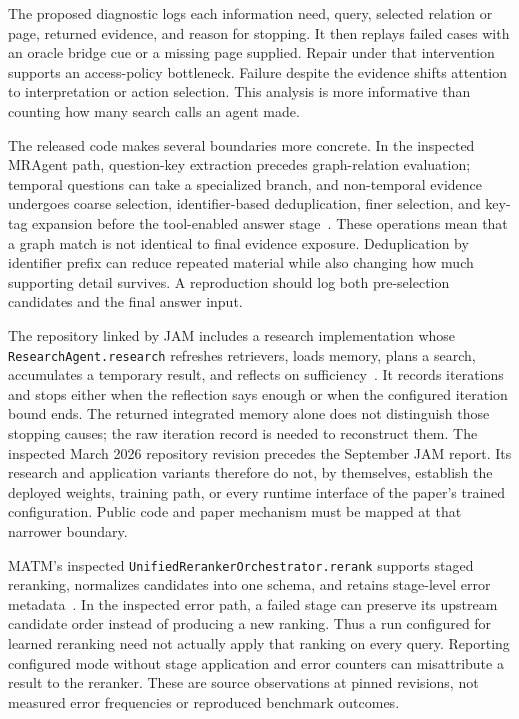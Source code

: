 The proposed diagnostic logs each information need, query, selected relation or page, returned evidence, and reason for stopping. It then replays failed cases with an oracle bridge cue or a missing page supplied. Repair under that intervention supports an access-policy bottleneck. Failure despite the evidence shifts attention to interpretation or action selection. This analysis is more informative than counting how many search calls an agent made.

The released code makes several boundaries more concrete. In the inspected MRAgent  path, question-key extraction precedes graph-relation evaluation; temporal questions can take a specialized branch, and non-temporal evidence undergoes coarse selection, identifier-based deduplication, finer selection, and key-tag expansion before the tool-enabled answer stage~\cite{repo_mragent2026}. These operations mean that a graph match is not identical to final evidence exposure. Deduplication by identifier prefix can reduce repeated material while also changing how much supporting detail survives. A reproduction should log both pre-selection candidates and the final answer input.

The repository linked by JAM includes a research implementation whose \texttt{ResearchAgent.research} refreshes retrievers, loads memory, plans a search, accumulates a temporary result, and reflects on sufficiency~\cite{repo_jam2026}. It records iterations and stops either when the reflection says enough or when the configured iteration bound ends. The returned integrated memory alone does not distinguish those stopping causes; the raw iteration record is needed to reconstruct them. The inspected March 2026 repository revision precedes the September JAM report. Its research and application variants therefore do not, by themselves, establish the deployed weights, training path, or every runtime interface of the paper's trained configuration. Public code and paper mechanism must be mapped at that narrower boundary.

MATM's inspected \texttt{UnifiedRerankerOrchestrator.rerank} supports staged reranking, normalizes candidates into one schema, and retains stage-level error metadata~\cite{repo_matm2026}. In the inspected error path, a failed stage can preserve its upstream candidate order instead of producing a new ranking. Thus a run configured for learned reranking need not actually apply that ranking on every query. Reporting configured mode without stage application and error counters can misattribute a result to the reranker. These are source observations at pinned revisions, not measured error frequencies or reproduced benchmark outcomes.

